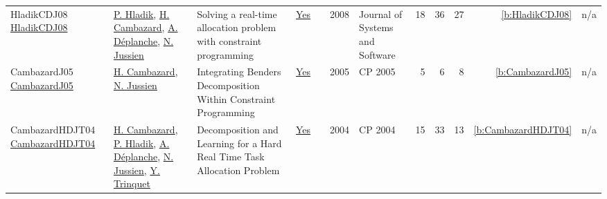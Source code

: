 {\begin{longtable}{>{\raggedright\arraybackslash}p{3cm}>{\raggedright\arraybackslash}p{6cm}>{\raggedright\arraybackslash}p{6.5cm}rrrp{2.5cm}rrrrr}
HladikCDJ08 \href{http://dx.doi.org/10.1016/j.jss.2007.02.032}{HladikCDJ08} & \hyperref[auth:a1178]{P. Hladik}, \hyperref[auth:a1011]{H. Cambazard}, \hyperref[auth:a1179]{A. Déplanche}, \hyperref[auth:a249]{N. Jussien} & Solving a real-time allocation problem with constraint programming & \href{../works/HladikCDJ08.pdf}{Yes} & \cite{HladikCDJ08} & 2008 & Journal of Systems and Software & 18 & 36 & 27 & \ref{b:HladikCDJ08} & n/a\\
CambazardJ05 \href{https://doi.org/10.1007/11564751_58}{CambazardJ05} & \hyperref[auth:a1011]{H. Cambazard}, \hyperref[auth:a249]{N. Jussien} & Integrating Benders Decomposition Within Constraint Programming & \href{../works/CambazardJ05.pdf}{Yes} & \cite{CambazardJ05} & 2005 & CP 2005 & 5 & 6 & 8 & \ref{b:CambazardJ05} & n/a\\
CambazardHDJT04 \href{https://doi.org/10.1007/978-3-540-30201-8_14}{CambazardHDJT04} & \hyperref[auth:a1011]{H. Cambazard}, \hyperref[auth:a1075]{P. Hladik}, \hyperref[auth:a1076]{A. D{\'{e}}planche}, \hyperref[auth:a249]{N. Jussien}, \hyperref[auth:a1077]{Y. Trinquet} & Decomposition and Learning for a Hard Real Time Task Allocation Problem & \href{../works/CambazardHDJT04.pdf}{Yes} & \cite{CambazardHDJT04} & 2004 & CP 2004 & 15 & 33 & 13 & \ref{b:CambazardHDJT04} & n/a\\
\end{longtable}
}

\clearpage
